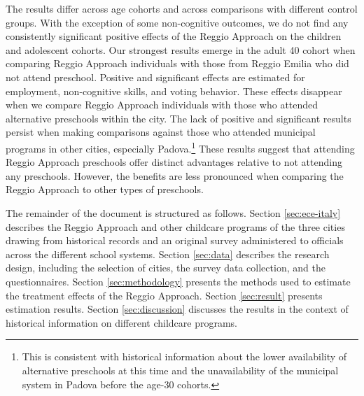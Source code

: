The results differ across age cohorts and across comparisons with different control groups. With the exception of some non-cognitive outcomes, we do not find any consistently significant positive effects of the Reggio Approach on the children and adolescent cohorts. Our strongest results emerge in the adult 40 cohort when comparing Reggio Approach individuals with those from Reggio Emilia who did not attend preschool. Positive and significant effects are estimated for employment, non-cognitive skills, and voting behavior. These effects disappear when we compare Reggio Approach individuals with those who attended alternative preschools within the city. The lack of positive and significant results persist when making comparisons against those who attended municipal programs in other cities, especially Padova.\footnote{This is consistent with historical information about the lower availability of alternative preschools at this time and the unavailability of the municipal system in Padova before the age-30 cohorts.} These results suggest that attending Reggio Approach preschools offer distinct advantages relative to not attending any preschools. However, the benefits are less pronounced when comparing the Reggio Approach to other types of preschools. 

The remainder of the document is structured as follows. Section \ref{sec:ece-italy} describes the Reggio Approach and other childcare programs of the three cities drawing from historical records and an original survey administered to officials across the different school systems. Section \ref{sec:data} describes the research design, including the selection of cities, the survey data collection, and the questionnaires. Section \ref{sec:methodology} presents the methods used to estimate the treatment effects of the Reggio Approach. Section \ref{sec:result} presents estimation results. Section \ref{sec:discussion} discusses the results in the context of historical information on different childcare programs. 

